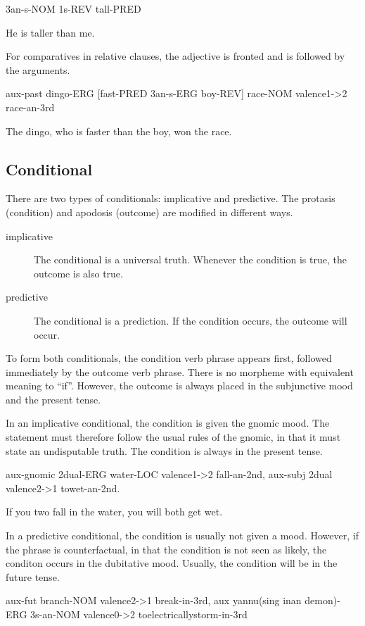 3an-s-NOM 1s-REV tall-PRED

He is taller than me.

For comparatives in relative clauses, the adjective is fronted and is followed
by the arguments.

aux-past dingo-ERG [fast-PRED 3an-s-ERG boy-REV] race-NOM valence1->2
race-an-3rd

The dingo, who is faster than the boy, won the race.

\subsection{Conditional}

There are two types of conditionals: implicative and predictive. The protasis
(condition) and apodosis (outcome) are modified in different ways.

\begin{description}
\item[implicative] The conditional is a universal truth. Whenever the condition
  is true, the outcome is also true.
\item[predictive] The conditional is a prediction. If the condition occurs, the
  outcome will occur.
\end{description}

To form both conditionals, the condition verb phrase appears first, followed
immediately by the outcome verb phrase. There is no morpheme with equivalent
meaning to ``if''. However, the outcome is always placed in the subjunctive
mood and the present tense.

In an implicative conditional, the condition is given the gnomic mood. The
statement must therefore follow the usual rules of the gnomic, in that it must
state an undisputable truth. The condition is always in the present tense.

aux-gnomic 2dual-ERG water-LOC valence1->2 fall-an-2nd, aux-subj 2dual
valence2->1 towet-an-2nd.

If you two fall in the water, you will both get wet.

In a predictive conditional, the condition is usually not given a mood.
However, if the phrase is counterfactual, in that the condition is not seen as
likely, the conditon occurs in the dubitative mood. Usually, the condition
will be in the future tense.

aux-fut branch-NOM valence2->1 break-in-3rd, aux yannu(sing inan demon)-ERG
3s-an-NOM valence0->2 toelectricallystorm-in-3rd

